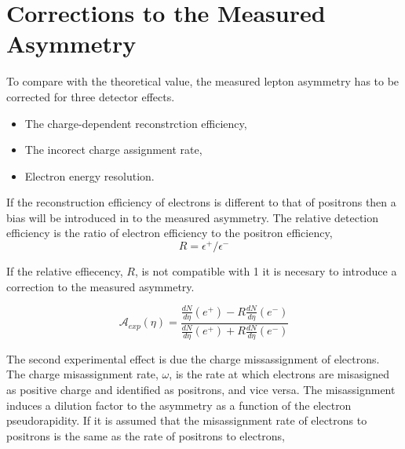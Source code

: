 \section{Corrections to the Measured Asymmetry}

To compare with the theoretical value, the measured lepton asymmetry has to be
corrected for three detector effects.
\begin{itemize}
\item The charge-dependent reconstrction efficiency,
\item The incorect charge assignment rate,
\item Electron energy resolution.
\end{itemize}

If the reconstruction efficiency of electrons is different to that of positrons
then a bias will be introduced in to the measured asymmetry.
The relative detection efficiency is the ratio of electron efficiency to the
positron efficiency,
\begin{equation}
 R = \epsilon^+/\epsilon^-
\end{equation}

If the relative effiecency, $R$, is not compatible with 1 it is necesary to
introduce a correction to the measured asymmetry.

\begin{equation}
\mathcal{A}_{exp}(\eta) = \frac{
                     \frac{dN}{d\eta}(e^+)- R\frac{dN}{d\eta}(e^-)
                     }
                     {
                     \frac{dN}{d\eta}(e^+)+ R\frac{dN}{d\eta}(e^-)
                     }
\end{equation}

The second experimental effect is due the charge missassignment of electrons.
The charge misassignment rate, $\omega$, is the rate at which electrons are
misasigned as positive charge and identified as positrons, and vice versa. The
misassignment induces a dilution factor to the asymmetry as a function of the
electron pseudorapidity. If it is assumed that the misassignment rate of
electrons to positrons is the same as the rate of positrons to electrons, \ie 

